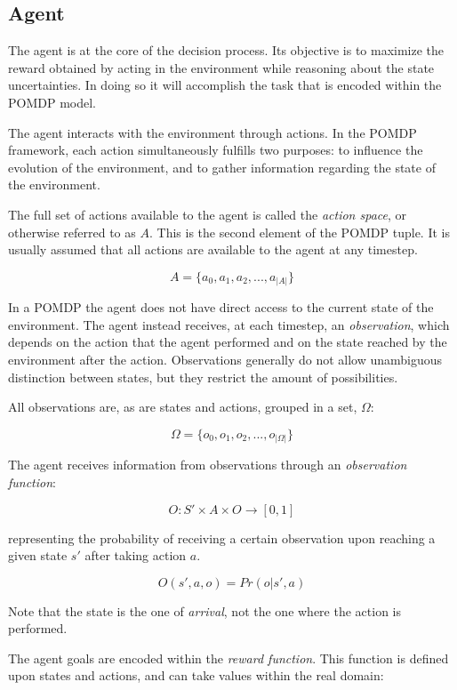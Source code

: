 \subsection{Agent}

The agent is at the core of the decision process. Its objective is to maximize the reward obtained
by acting in the environment while reasoning about the state uncertainties. In doing so it will
accomplish the task that is encoded within the POMDP model.

The agent interacts with the environment through actions. In the POMDP framework, each action
simultaneously fulfills two purposes: to influence the evolution of the environment, and to gather
information regarding the state of the environment.

The full set of actions available to the agent is called the \textit{action space}, or otherwise
referred to as $A$. This is the second element of the POMDP tuple. It is usually assumed that all
actions are available to the agent at any timestep.

\[ A = \{ a_0, a_1, a_2, ..., a_{|A|} \} \]

In a POMDP the agent does not have direct access to the current state of the environment. The agent
instead receives, at each timestep, an \textit{observation}, which depends on the action that the
agent performed and on the state reached by the environment after the action. Observations generally
do not allow unambiguous distinction between states, but they restrict the amount of possibilities.

All observations are, as are states and actions, grouped in a set, $\Omega$:

\[ \Omega = \{ o_0, o_1, o_2, ..., o_{|\Omega|} \} \]

The agent receives information from observations through an \textit{observation function}:

\[ O : S' \times A \times O \rightarrow [0,1] \]

representing the probability of receiving a certain observation upon reaching a given state $s'$
after taking action $a$.

\[ O(s', a, o) = Pr(o | s', a) \]

Note that the state is the one of \textit{arrival}, not the one where the action is performed.

The agent goals are encoded within the \textit{reward function}.  This function is defined upon
states and actions, and can take values within the real domain:


